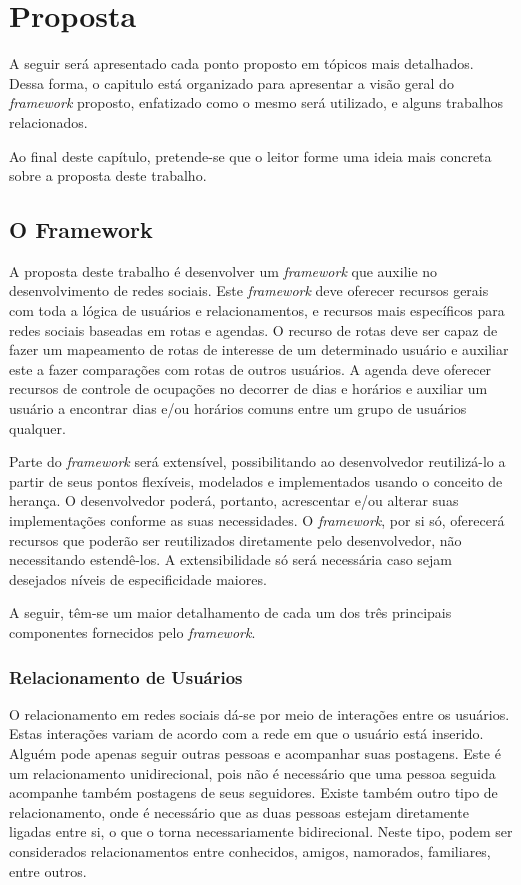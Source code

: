 \chapter{Proposta}
\label{chapter:Proposta}

A seguir será apresentado cada ponto proposto em tópicos mais detalhados. Dessa forma, o capitulo está organizado para apresentar a visão geral do \textit{framework} proposto, enfatizado como o mesmo será utilizado, e alguns trabalhos relacionados.

Ao final deste capítulo, pretende-se que o leitor forme uma ideia mais concreta sobre a proposta deste trabalho.

\section{O Framework}

A proposta deste trabalho é desenvolver um \textit{framework} que auxilie no desenvolvimento de redes sociais. Este \textit{framework} deve oferecer recursos gerais com toda a lógica de usuários e relacionamentos, e recursos mais específicos para redes sociais baseadas em rotas e agendas. O recurso de rotas deve ser capaz de fazer um mapeamento de rotas de interesse de um determinado usuário e auxiliar este a fazer comparações com rotas de outros usuários. A agenda deve oferecer recursos de controle de ocupações no decorrer de dias e horários e auxiliar um usuário a encontrar dias e/ou horários comuns entre um grupo de usuários qualquer.

Parte do \textit{framework} será extensível, possibilitando ao desenvolvedor reutilizá-lo a partir de seus pontos flexíveis, modelados e implementados usando o conceito de herança. O desenvolvedor poderá, portanto, acrescentar e/ou alterar suas implementações conforme as suas necessidades. O \textit{framework}, por si só, oferecerá recursos que poderão ser reutilizados diretamente pelo desenvolvedor, não necessitando estendê-los. A extensibilidade só será necessária caso sejam desejados níveis de especificidade maiores.

A seguir, têm-se um maior detalhamento de cada um dos três principais componentes fornecidos pelo \textit{framework}.

\subsection{Relacionamento de Usuários}

O relacionamento em redes sociais dá-se por meio de interações entre os usuários. Estas interações variam de acordo com a rede em que o usuário está inserido. Alguém pode apenas seguir outras pessoas e acompanhar suas postagens. Este é um relacionamento unidirecional, pois não é necessário que uma pessoa seguida acompanhe também postagens de seus seguidores. Existe também outro tipo de relacionamento, onde é necessário que as duas pessoas estejam diretamente ligadas entre si, o que o torna necessariamente bidirecional. Neste tipo, podem ser considerados relacionamentos entre conhecidos, amigos, namorados, familiares, entre outros.

